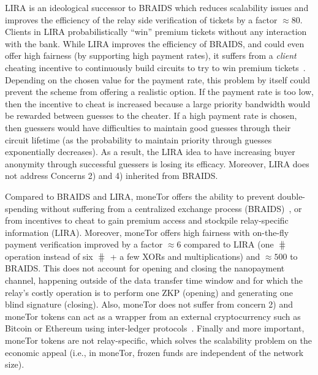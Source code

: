 LIRA is an ideological successor to BRAIDS which reduces scalability
issues and improves the efficiency of the relay side verification of
tickets by a factor $\approx 80$. Clients in LIRA probabilistically
``win'' premium tickets without any interaction with the bank. While
LIRA improves the efficiency of BRAIDS, and could even offer high
fairness (by supporting high payment rates), it suffers from a
\textit{client} cheating incentive to continuously build circuits to
try to win premium tickets~\cite{jansen2013lira,
  jansenblogpost}. Depending on the chosen value for the payment rate,
this problem by itself could prevent the scheme from offering a
realistic option. If the payment rate is too low, then the incentive
to cheat is increased because a large priority bandwidth would be
rewarded between guesses to the cheater. If a high payment rate is chosen, then
guessers would have difficulties to maintain good guesses through
their circuit lifetime (as the probability to maintain priority
through guesses exponentially decreases). As a result, the LIRA idea
to have increasing buyer anonymity through successful guessers is
losing its efficacy. Moreover, LIRA does not address Concerns 2)
and 4) inherited from BRAIDS.

Compared to BRAIDS and LIRA, moneTor offers the ability to prevent
double-spending without suffering from a centralized exchange process
(BRAIDS)~\cite{jansenblogpost}, or from incentives to cheat to gain
premium access and stockpile relay-specific information
(LIRA). Moreover, moneTor offers high fairness with on-the-fly payment
verification improved by a factor $\approx 6$ compared to LIRA (one
$\hash$ operation instead of six $\hash$ + a few XORs and multiplications) and $\approx 500$ to BRAIDS. This does not account for opening and closing the nanopayment channel, happening outside of the data transfer time window and for which the relay's costly operation is to perform one ZKP (opening) and generating one blind signature (closing). Also,
moneTor does not suffer from concern 2) and moneTor tokens can act as a
wrapper from an external cryptocurrency such as Bitcoin or Ethereum
using inter-ledger protocols~\cite{back2014enabling,
  poon2017plasma}. 
  Finally and more
important, moneTor tokens are not relay-specific, which solves the
scalability problem on the economic appeal (i.e., in moneTor, frozen
funds are independent of the network size).

